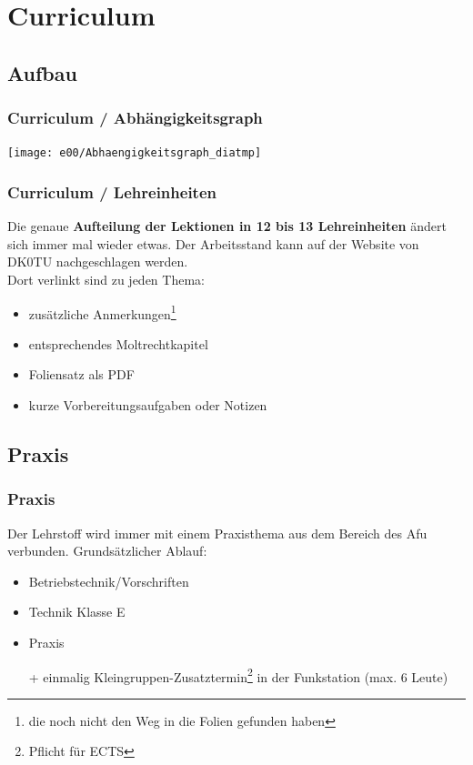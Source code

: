 \section{Curriculum}

\subsection{Aufbau}

\begin{frame}
    \frametitle{Curriculum / Abhängigkeitsgraph}

    \texttt{[image: e00/Abhaengigkeitsgraph\_diatmp]}

\end{frame}

\begin{frame}
    \frametitle{Curriculum / Lehreinheiten}

    Die genaue \textbf{Aufteilung der Lektionen in 12 bis 13 Lehreinheiten}
    ändert sich immer mal wieder etwas. Der Arbeitsstand kann auf der Website
    von DK0TU\hyperlink{refs}{\cite{curr}} nachgeschlagen werden. \\[2em]

    Dort verlinkt sind zu jeden Thema:

    \begin{itemize}
        \item zusätzliche Anmerkungen\footnote{die noch nicht den Weg in die
              Folien gefunden haben}
        \item entsprechendes Moltrechtkapitel
        \item Foliensatz als PDF
        \item kurze Vorbereitungsaufgaben oder Notizen
    \end{itemize}

\end{frame}

\subsection{Praxis}

\begin{frame}
    \frametitle{Praxis}

    Der Lehrstoff wird immer mit einem Praxisthema aus dem Bereich des Afu
    verbunden. Grundsätzlicher Ablauf:

    \begin{itemize}
        \item Betriebstechnik/Vorschriften
        \item Technik Klasse E
        \item Praxis
        \item[+] einmalig Kleingruppen-Zusatztermin\footnote{Pflicht für ECTS} in der
        Funkstation (max. 6 Leute)
    \end{itemize}

\end{frame}

